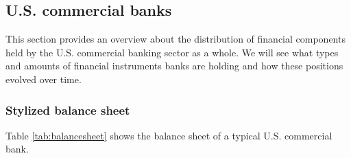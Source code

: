\documentclass[12pt, a4paper]{article} %
\begin{document}

\subsection{U.S. commercial banks}
\label{sec:AssetLiabs}

This section provides an overview about the distribution of financial components held by the U.S. commercial banking sector as a whole. We will see what types and amounts of financial instruments banks are holding and how these positions evolved over time. 

\subsubsection{Stylized balance sheet}


Table \ref{tab:balancesheet} shows the balance sheet of a typical U.S. commercial bank.
\end{document}
